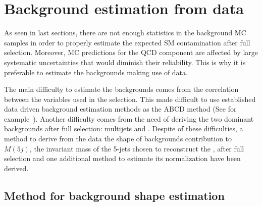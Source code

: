 \section{Background estimation from data}
\label{sec:bkg}

As seen in last sections, there are not enough statistics in the background MC samples in order to properly estimate the expected SM contamination after full selection. Moreover, MC predictions for the QCD component are affected by large systematic uncertainties that would diminish their reliability. This is why it is preferable to estimate the backgrounds making use of data.

The main difficulty to estimate the backgrounds comes from the correlation between the variables used in the selection. This made difficult to use established data driven background estimation methods as the ABCD method (See for example~\cite{Khachatryan:2015axa}). Another difficulty comes from the need of deriving the two dominant backgrounds after full selection: multijets and \ttbar. Despite of these difficulties, a method to derive from the data the shape of backgrounds contribution to $M(5j)$, the invariant mass of the 5-jets chosen to reconstruct the \Tp, after full selection and one additional method to estimate its normalization have been derived.

%
%
%

\subsection{Method for background shape estimation}
\label{sec:bkgmet}

